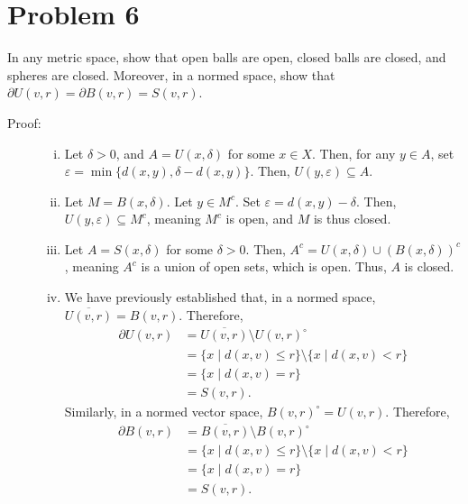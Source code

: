 \documentclass[8pt]{extarticle}
\begin{document}
  \section{Problem 6}%
  In any metric space, show that open balls are open, closed balls are closed, and spheres are closed. Moreover, in a normed space, show that $\partial U(v,r) = \partial B(v,r) = S(v,r)$.
  \begin{description}
    \item[Proof:]\hfill
      \begin{enumerate}[(i)]
        \item Let $\delta > 0$, and $A = U(x,\delta)$ for some $x\in X$. Then, for any $y\in A$, set $\varepsilon = \min\{d(x,y),\delta-d(x,y)\}$. Then, $U(y,\varepsilon)\subseteq A$.
        \item Let $M = B(x,\delta)$. Let $y\in M^{c}$. Set $\varepsilon = d(x,y) - \delta$. Then, $U(y,\varepsilon)\subseteq M^{c}$, meaning $M^{c}$ is open, and $M$ is thus closed.
        \item Let $A = S(x,\delta)$ for some $\delta > 0$. Then, $A^{c} = U(x,\delta) \cup (B(x,\delta))^{c}$, meaning $A^{c}$ is a union of open sets, which is open. Thus, $A$ is closed.
        \item We have previously established that, in a normed space, $\overline{U(v,r)} = B(v,r)$. Therefore, 
          \begin{align*}
            \partial U(v,r) &= \overline{U(v,r)}\setminus U(v,r)^{\circ}\\
                            &= \{x\mid d(x,v) \leq r\} \setminus \{x\mid d(x,v) < r\}\\
                            &= \{x\mid d(x,v) = r\}\\
                            &= S(v,r).
          \end{align*}
          Similarly, in a normed vector space, $B(v,r)^{\circ} = U(v,r)$. Therefore,
          \begin{align*}
            \partial B(v,r) &= \overline{B(v,r)}\setminus B(v,r)^{\circ}\\
                            &= \{x\mid d(x,v) \leq r\} \setminus \{x\mid d(x,v) < r\}\\
                            &= \{x\mid d(x,v) = r\}\\
                            &= S(v,r).
          \end{align*}
      \end{enumerate}
  \end{description}
\end{document}
